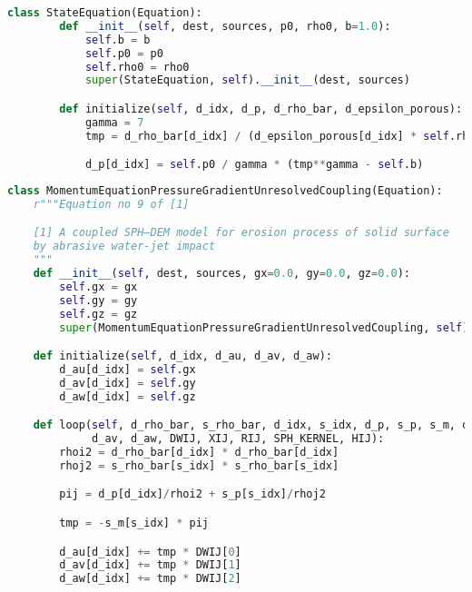 \documentclass[preprint,12pt]{elsarticle}
\begin{document}
\begin{lstlisting}[label={contact:equations},frame=lines,language=Python,upquote=True]
    class StateEquation(Equation):
        def __init__(self, dest, sources, p0, rho0, b=1.0):
            self.b = b
            self.p0 = p0
            self.rho0 = rho0
            super(StateEquation, self).__init__(dest, sources)

        def initialize(self, d_idx, d_p, d_rho_bar, d_epsilon_porous):
            gamma = 7
            tmp = d_rho_bar[d_idx] / (d_epsilon_porous[d_idx] * self.rho0)

            d_p[d_idx] = self.p0 / gamma * (tmp**gamma - self.b)
\end{lstlisting}


\begin{lstlisting}[label={contact:equations},frame=lines,language=Python,upquote=True]
class MomentumEquationPressureGradientUnresolvedCoupling(Equation):
    r"""Equation no 9 of [1]

    [1] A coupled SPH–DEM model for erosion process of solid surface
    by abrasive water-jet impact
    """
    def __init__(self, dest, sources, gx=0.0, gy=0.0, gz=0.0):
        self.gx = gx
        self.gy = gy
        self.gz = gz
        super(MomentumEquationPressureGradientUnresolvedCoupling, self).__init__(dest, sources)

    def initialize(self, d_idx, d_au, d_av, d_aw):
        d_au[d_idx] = self.gx
        d_av[d_idx] = self.gy
        d_aw[d_idx] = self.gz

    def loop(self, d_rho_bar, s_rho_bar, d_idx, s_idx, d_p, s_p, s_m, d_au,
             d_av, d_aw, DWIJ, XIJ, RIJ, SPH_KERNEL, HIJ):
        rhoi2 = d_rho_bar[d_idx] * d_rho_bar[d_idx]
        rhoj2 = s_rho_bar[s_idx] * s_rho_bar[s_idx]

        pij = d_p[d_idx]/rhoi2 + s_p[s_idx]/rhoj2

        tmp = -s_m[s_idx] * pij

        d_au[d_idx] += tmp * DWIJ[0]
        d_av[d_idx] += tmp * DWIJ[1]
        d_aw[d_idx] += tmp * DWIJ[2]
\end{lstlisting}
\end{document}
